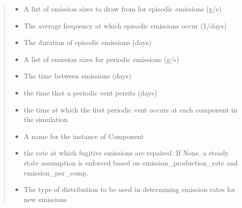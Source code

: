 \documentclass[letterpaper,10pt,english]{sphinxmanual}
\begin{document}
\begin{fulllineitems}
\begin{quote}
\begin{description}
\begin{itemize}
\item {} 
 \textendash{} A list of emission sizes to draw from for episodic emissions (g/s)

\item {} 
 \textendash{} The average frequency at which episodic emissions occur (1/days)

\item {} 
 \textendash{} The duration of episodic emissions (days)

\item {} 
 \textendash{} A list of emission sizes for periodic emissions (g/s)

\item {} 
 \textendash{} The time between emissions (days)

\item {} 
 \textendash{} the time that a periodic vent persits (days)

\item {} 
 \textendash{} the time at which the first periodic vent occurs at each component in the simulation

\item {} 
 \textendash{} A name for the instance of Component

\item {} 
 \textendash{} the rate at which fugitive emissions are repaired. If None, a steady state
assumption is enforced based on emission\_production\_rate and emission\_per\_comp.

\item {} 
 \textendash{} The type of distribution to be used in determining emission rates for new emissions

\end{itemize}

\end{description}\end{quote}

\end{fulllineitems}
\end{document}
